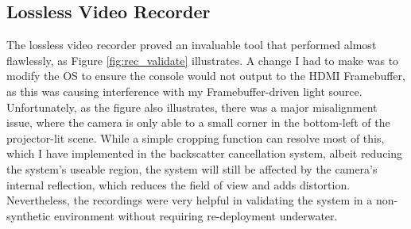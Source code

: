 \subsection{Lossless Video Recorder}
The lossless video recorder proved an invaluable tool that performed almost flawlessly, as Figure \ref{fig:rec_validate} illustrates. A change I had to make was to modify the OS to ensure the console would not output to the HDMI Framebuffer, as this was causing interference with my Framebuffer-driven light source. Unfortunately, as the figure also illustrates, there was a major misalignment issue, where the camera is only able to a small corner in the bottom-left of the projector-lit scene. While a simple cropping function can resolve most of this, which I have implemented in the backscatter cancellation system, albeit reducing the system's useable region, the system will still be affected by the camera's internal reflection, which reduces the field of view and adds distortion. Nevertheless, the recordings were very helpful in validating the system in a non-synthetic environment without requiring re-deployment underwater.

